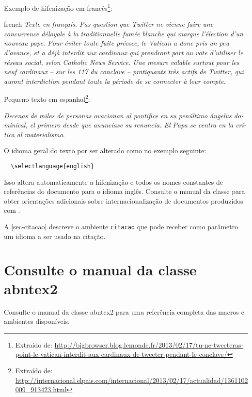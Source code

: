 Exemplo de hifenização em francês\footnote{Extraído de:
\url{http://bigbrowser.blog.lemonde.fr/2013/02/17/tu-ne-tweeteras-point-le-vatican-interdit-aux-cardinaux-de-tweeter-pendant-le-conclave/}}:

\begin{otherlanguage*}{french}
\textit{Texte en français. Pas question que Twitter ne vienne faire une
concurrence déloyale à la traditionnelle fumée blanche qui marque l'élection
d'un nouveau pape. Pour éviter toute fuite précoce, le Vatican a donc pris un
peu d'avance, et a déjà interdit aux cardinaux qui prendront part au vote
d'utiliser le réseau social, selon Catholic News Service. Une mesure valable
surtout pour les neuf cardinaux – sur les 117 du conclave – pratiquants très
actifs de Twitter, qui auront interdiction pendant toute la période de se
connecter à leur compte.}
\end{otherlanguage*}

Pequeno texto em espanhol\footnote{Extraído de:
\url{http://internacional.elpais.com/internacional/2013/02/17/actualidad/1361102009_913423.html}}:

\foreignlanguage{spanish}{\textit{Decenas de miles de personas ovacionan al pontífice en su
penúltimo ángelus dominical, el primero desde que anunciase su renuncia. El Papa se
centra en la crítica al materialismo}}.

O idioma geral do texto por ser alterado como no exemplo seguinte:

\begin{verbatim}
  \selectlanguage{english}
\end{verbatim}

Isso altera automaticamente a hifenização e todos os nomes constantes de
referências do documento para o idioma inglês. Consulte o manual da classe
\cite{abntex2classe} para obter orientações adicionais sobre internacionalização de
documentos produzidos com \abnTeX.

A \autoref{sec-citacao} descreve o ambiente \texttt{citacao} que pode receber
como parâmetro um idioma a ser usado na citação.

\section{Consulte o manual da classe \textsf{abntex2}}

Consulte o manual da classe \textsf{abntex2} \cite{abntex2classe} para uma
referência completa das macros e ambientes disponíveis.

